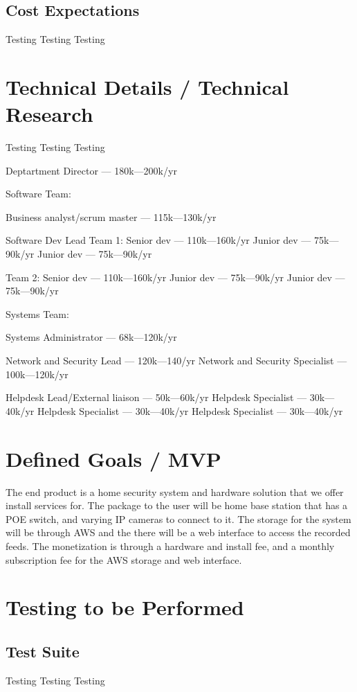 \documentclass{report}
\begin{document}
\section{Cost Expectations}
Testing Testing Testing

\chapter{Technical Details / Technical Research}
Testing Testing Testing

Deptartment Director — 180k—200k/yr

Software Team:

    Business analyst/scrum master — 115k—130k/yr

    Software Dev Lead
        Team 1:
    Senior dev — 110k—160k/yr
        Junior dev — 75k—90k/yr
        Junior dev — 75k—90k/yr
        
        Team 2:
        Senior dev — 110k—160k/yr
        Junior dev — 75k—90k/yr
        Junior dev — 75k—90k/yr


Systems Team:

    Systems Administrator — 68k—120k/yr

    Network and Security Lead — 120k—140/yr
        Network and Security Specialist — 100k—120k/yr
        
    Helpdesk Lead/External liaison — 50k—60k/yr
        Helpdesk Specialist — 30k—40k/yr
        Helpdesk Specialist — 30k—40k/yr
        Helpdesk Specialist — 30k—40k/yr



\chapter{Defined Goals / MVP}
The end product is a home security system and hardware solution that we offer install services for. 
The package to the user will be home base station that has a POE switch, and varying IP cameras to connect to it. 
The storage for the system will be through AWS and the there will be a web interface to access the recorded feeds. 
The monetization is through a hardware and install fee, and a monthly subscription fee for the AWS storage and web interface. 

\chapter{Testing to be Performed}
\section{Test Suite}
Testing Testing Testing
\end{document}
